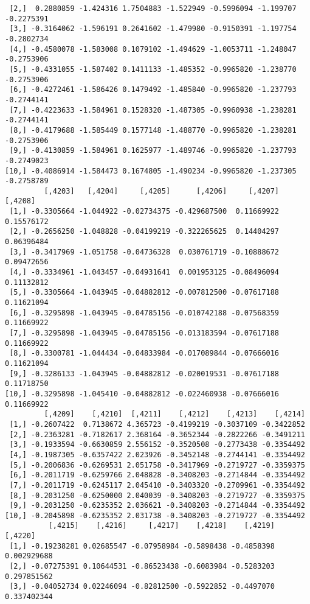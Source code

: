 \documentclass[
  letterpaper,
  DIV=11,
  numbers=noendperiod]{scrreprt}
\begin{document}
\begin{verbatim}
 [2,]  0.2880859 -1.424316 1.7504883 -1.522949 -0.5996094 -1.199707 -0.2275391
 [3,] -0.3164062 -1.596191 0.2641602 -1.479980 -0.9150391 -1.197754 -0.2802734
 [4,] -0.4580078 -1.583008 0.1079102 -1.494629 -1.0053711 -1.248047 -0.2753906
 [5,] -0.4331055 -1.587402 0.1411133 -1.485352 -0.9965820 -1.238770 -0.2753906
 [6,] -0.4272461 -1.586426 0.1479492 -1.485840 -0.9965820 -1.237793 -0.2744141
 [7,] -0.4223633 -1.584961 0.1528320 -1.487305 -0.9960938 -1.238281 -0.2744141
 [8,] -0.4179688 -1.585449 0.1577148 -1.488770 -0.9965820 -1.238281 -0.2753906
 [9,] -0.4130859 -1.584961 0.1625977 -1.489746 -0.9965820 -1.237793 -0.2749023
[10,] -0.4086914 -1.584473 0.1674805 -1.490234 -0.9965820 -1.237305 -0.2758789
         [,4203]   [,4204]     [,4205]      [,4206]     [,4207]    [,4208]
 [1,] -0.3305664 -1.044922 -0.02734375 -0.429687500  0.11669922 0.15576172
 [2,] -0.2656250 -1.048828 -0.04199219 -0.322265625  0.14404297 0.06396484
 [3,] -0.3417969 -1.051758 -0.04736328  0.030761719 -0.10888672 0.09472656
 [4,] -0.3334961 -1.043457 -0.04931641  0.001953125 -0.08496094 0.11132812
 [5,] -0.3305664 -1.043945 -0.04882812 -0.007812500 -0.07617188 0.11621094
 [6,] -0.3295898 -1.043945 -0.04785156 -0.010742188 -0.07568359 0.11669922
 [7,] -0.3295898 -1.043945 -0.04785156 -0.013183594 -0.07617188 0.11669922
 [8,] -0.3300781 -1.044434 -0.04833984 -0.017089844 -0.07666016 0.11621094
 [9,] -0.3286133 -1.043945 -0.04882812 -0.020019531 -0.07617188 0.11718750
[10,] -0.3295898 -1.045410 -0.04882812 -0.022460938 -0.07666016 0.11669922
         [,4209]    [,4210]  [,4211]    [,4212]    [,4213]    [,4214]
 [1,] -0.2607422  0.7138672 4.365723 -0.4199219 -0.3037109 -0.3422852
 [2,] -0.2363281 -0.7182617 2.368164 -0.3652344 -0.2822266 -0.3491211
 [3,] -0.1933594 -0.6630859 2.556152 -0.3520508 -0.2773438 -0.3354492
 [4,] -0.1987305 -0.6357422 2.023926 -0.3452148 -0.2744141 -0.3354492
 [5,] -0.2006836 -0.6269531 2.051758 -0.3417969 -0.2719727 -0.3359375
 [6,] -0.2011719 -0.6259766 2.048828 -0.3408203 -0.2714844 -0.3354492
 [7,] -0.2011719 -0.6245117 2.045410 -0.3403320 -0.2709961 -0.3354492
 [8,] -0.2031250 -0.6250000 2.040039 -0.3408203 -0.2719727 -0.3359375
 [9,] -0.2031250 -0.6235352 2.036621 -0.3408203 -0.2714844 -0.3354492
[10,] -0.2045898 -0.6235352 2.031738 -0.3408203 -0.2719727 -0.3354492
          [,4215]    [,4216]     [,4217]    [,4218]    [,4219]     [,4220]
 [1,] -0.19238281 0.02685547 -0.07958984 -0.5898438 -0.4858398 0.002929688
 [2,] -0.07275391 0.10644531 -0.86523438 -0.6083984 -0.5283203 0.297851562
 [3,] -0.04052734 0.02246094 -0.82812500 -0.5922852 -0.4497070 0.337402344

\end{verbatim}
\end{document}
